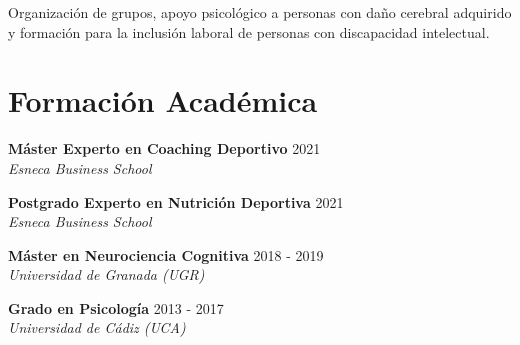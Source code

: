 \documentclass[letterpaper,11pt]{article}
\begin{document}
    \vspace{0.1cm}
    
    {\small Organización de grupos, apoyo psicológico a personas con daño cerebral adquirido y formación para la inclusión laboral de personas con discapacidad intelectual.}
    
    \vspace{0.4cm}

\section{Formación Académica}
    \noindent
    \begin{minipage}[t]{1.0\linewidth}
        {\textbf{Máster Experto en Coaching Deportivo}} 
        \hfill 
        {\small 2021} \\
        {\color{detailgray}\textit{Esneca Business School}}
    \end{minipage}
    \par 
    \vspace{0.2cm} 
    \noindent
    \begin{minipage}[t]{1.0\linewidth}
        {\textbf{Postgrado Experto en Nutrición Deportiva}} 
        \hfill 
        {\small 2021} \\
        {\color{detailgray}\textit{Esneca Business School}}
    \end{minipage}
    \par 
    \vspace{0.2cm} 
    \noindent
    \begin{minipage}[t]{1.0\linewidth}
        {\textbf{Máster en Neurociencia Cognitiva}} 
        \hfill 
        {\small 2018 - 2019} \\
        {\color{detailgray}\textit{Universidad de Granada (UGR)}}
    \end{minipage}
    \par 
    \vspace{0.2cm} 
    \noindent
    \begin{minipage}[t]{1.0\linewidth}
        {\textbf{Grado en Psicología}} 
        \hfill 
        {\small 2013 - 2017} \\
        {\color{detailgray}\textit{Universidad de Cádiz (UCA)}}
    \end{minipage}
    \par 
    \vspace{0.2cm} 
\end{document}
